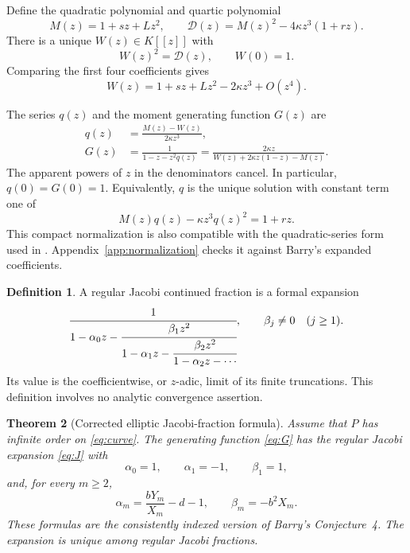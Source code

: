 \documentclass[11pt,letterpaper]{article}
\numberwithin{equation}{section}
\newtheorem{theorem}{Theorem}[section]
\theoremstyle{definition}
\newtheorem{definition}[theorem]{Definition}
\theoremstyle{remark}
\newcommand{\K}{K}
\newcommand{\D}{\mathcal{D}}
\begin{document}
Define the quadratic polynomial and quartic polynomial
\begin{equation}\label{eq:quartic}
 M(z)=1+sz+Lz^2,\qquad
 \D(z)=M(z)^2-4\kappa z^3(1+rz).
\end{equation}
There is a unique $W(z)\in\K[[z]]$ with
\begin{equation}\label{eq:W}
 W(z)^2=\D(z),\qquad W(0)=1.
\end{equation}
Comparing the first four coefficients gives
\begin{equation}\label{eq:Wleading}
 W(z)=1+sz+Lz^2-2\kappa z^3+O(z^4).
\end{equation}

The series $q(z)$ and the moment generating function $G(z)$ are
\begin{align}
 q(z)&=\frac{M(z)-W(z)}{2\kappa z^3},\label{eq:qradical}\\
 G(z)&=\frac{1}{1-z-z^2q(z)}
      =\frac{2\kappa z}{W(z)+2\kappa z(1-z)-M(z)}.
      \label{eq:G}
\end{align}
The apparent powers of $z$ in the denominators cancel. In particular,
$q(0)=G(0)=1$. Equivalently, $q$ is the unique solution with constant term
one of
\begin{equation}\label{eq:qequation}
 M(z)q(z)-\kappa z^3q(z)^2=1+rz.
\end{equation}
This compact normalization is also compatible with the quadratic-series
form used in \cite[Section~5.2]{LWZ2026}. Appendix~\ref{app:normalization}
checks it against Barry's expanded coefficients.

\begin{definition}
A regular Jacobi continued fraction is a formal expansion
\begin{equation}\label{eq:J}
 \cfrac{1}{1-\alpha_0z-
 \cfrac{\beta_1z^2}{1-\alpha_1z-
 \cfrac{\beta_2z^2}{1-\alpha_2z-\cdots}}},
 \qquad \beta_j\ne0\quad(j\ge1).
\end{equation}
Its value is the coefficientwise, or $z$-adic, limit of its finite
truncations. This definition involves no analytic convergence assertion.
\end{definition}

\begin{theorem}[Corrected elliptic Jacobi-fraction formula]\label{thm:main}
Assume that $P$ has infinite order on \eqref{eq:curve}. The generating
function \eqref{eq:G} has the regular Jacobi expansion \eqref{eq:J} with
\begin{equation}\label{eq:coeffs}
 \alpha_0=1,\qquad \alpha_1=-1,\qquad \beta_1=1,
\end{equation}
and, for every $m\ge2$,
\begin{equation}\label{eq:ellipticcoeffs}
 \boxed{\quad
 \alpha_m=\frac{bY_m}{X_m}-d-1,\qquad
 \beta_m=-b^2X_m.\quad}
\end{equation}
These formulas are the consistently indexed version of Barry's
Conjecture~4. The expansion is unique among regular Jacobi fractions.
\end{theorem}
\end{document}
